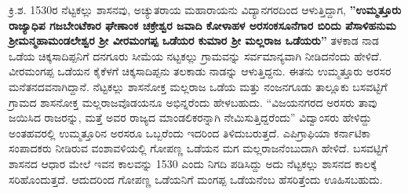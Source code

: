 ಕ್ರಿ.ಶ. 1530ರ ನೆಟ್ಟಕಲ್ಲು ಶಾಸನವು, ಅಚ್ಯುತರಾಯ ಮಹಾರಾಯನು ವಿದ್ಯಾನಗರದಿಂದ ಆಳುತ್ತಿದ್ದಾಗ, \textbf{''ಉಮ್ಮತ್ತೂರು ರಾಜ್ಯಾಧಿಪ ಗಜಬೇಂಟೆಕಾರ ಘೇಣಾಂಕ ಚಕ್ರೇಶ್ವರ ಜವಾದಿ ಕೋಳಾಹಳ ಅರಸಂಕಸೂನೆಗಾರ ಬಿರಿದು\general{\break } ಪೆಸಾಳಿಹನುಮ ಶ‍್ರೀಮನ್ಮಹಾಮಂಡಲೇಶ್ವರ ಶ‍್ರೀ ವೀರಮಂಗಪ್ಪ ಒಡೆಯರ ಕುಮಾರ ಶ‍್ರೀ ಮಲ್ಲರಾಜ ಒಡೆಯರು''} ತಳಕಾಡ ನಾಡ ಒಡೆಯ ಚಿಕ್ಕಸಾದಿಪ್ಪನಿಗೆ ದನಗೂರು ಸೀಮೆಯ ನಟ್ಟಕಲ್ಲು ಗ್ರಾಮವನ್ನು ಸರ್ವಮಾನ್ಯವಾಗಿ ನೀಡಿದನೆಂದು ಹೇಳಿದೆ. ವೀರಮಂಗಪ್ಪ ಒಡೆಯನ ಕೈಕೆಳಗೆ ಚಿಕ್ಕಸಾದಿಪ್ಪನು ತಲಕಾಡು ನಾಡನ್ನು ಆಳುತ್ತಿದ್ದನು. ಈತನು ಉಮ್ಮತ್ತೂರು ಅರಸರ ಮನೆತನದವನಾಗಿದ್ದಾನೆ. ನೆಟ್ಟಕಲ್ಲು ಶಾಸನೋಕ್ತ ಮಲ್ಲರಾಜ ಒಡೆಯ ಮತ್ತು ನಂಜನಗೂಡು ತಾಲ್ಲೂಕು ಬಸವಟ್ಟಿಗೆ ಗ್ರಾಮದ ಶಾಸನೋಕ್ತ ಮಲ್ಲರಾಜವೊಡಯನೂ ಅಭಿನ್ನರೆಂದು ಹೇಳಬಹುದು. “ವಿಜಯನಗರದ ಅರಸರು ತಾವು ಜಯಿಸಿದ ರಾಜರನ್ನು, ಮತ್ತೆ ಅವರ ರಾಜ್ಯದ ಮಾಂಡಲಿಕರನ್ನಾಗಿ ನೇಮಿಸುತ್ತಿದ್ದರೆಂದು” ವಿದ್ವಾಂಸರು ಹೇಳಿದ್ದು ಅಂತಹವರಲ್ಲಿ ಉಮ್ಮತ್ತೂರಿನ ಅರಸರೂ ಒಬ್ಬರೆಂದು ಇದರಿಂದ ತಿಳಿದು\-ಬರುತ್ತದೆ. ಎಪಿಗ್ರಾಫಿಯಾ ಕರ್ನಾಟಿಕಾ ಸಂಪಾದಕರು ನೀಡಿರುವ ವಂಶಾವಳಿಯಲ್ಲಿ ಗೋಪಣ್ಣ ಒಡೆಯನ ಮಗ ಮಲ್ಲರಾಜ\-ನೆಂಬುದಾಗಿ ಹೇಳಿದೆ. ಬಸವಟ್ಟಿಗೆ ಶಾಸನದ ಆಧಾರ ಮೇಲೆ ಇವನ ಕಾಲವನ್ನು 1530 ಎಂದು ನಿಗದಿ ಪಡಿಸಿದ್ದು ಅದು ನೆಟ್ಟಕಲ್ಲು ಶಾಸನದ ಕಾಲಕ್ಕೆ ಸರಿಹೊಂದುತ್ತದೆ. ಆದುದರಿಂದ ಗೋಪಣ್ಣ ಒಡೆಯನಿಗೆ ಮಂಗಪ್ಪ ಒಡೆಯನೆಂಬ ಹೆಸರಿತ್ತೆಂದು ಊಹಿಸಬಹುದು.

